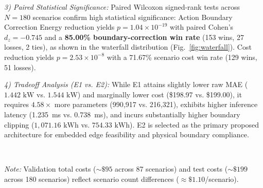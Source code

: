 \documentclass[journal]{IEEEtran}
\theoremstyle{remark}
\begin{document}
\textit{3) Paired Statistical Significance:} Paired Wilcoxon signed-rank tests across $N=180$ scenarios confirm high statistical significance: Action Boundary Correction Energy reduction yields \textbf{$p = 1.04 \times 10^{-19}$} with paired Cohen's \textbf{$d_z = -0.745$} and a \textbf{85.00\% boundary-correction win rate} (153 wins, 27 losses, 2 ties), as shown in the waterfall distribution (Fig.~\ref{fig:waterfall}). Cost reduction yields $p = 2.53 \times 10^{-8}$ with a 71.67\% scenario cost win rate (129 wins, 51 losses).

\textit{4) Tradeoff Analysis (E1 vs. E2):} While E1 attains slightly lower raw MAE ($1.442\text{ kW}$ vs. $1.544\text{ kW}$) and marginally lower cost (\$198.97 vs. \$199.00), it requires $4.58\times$ more parameters (990,917 vs. 216,321), exhibits higher inference latency (1.235~ms vs. 0.738~ms), and incurs substantially higher boundary clipping ($1,071.16\text{ kWh}$ vs. $754.33\text{ kWh}$). E2 is selected as the primary proposed architecture for embedded edge feasibility and physical boundary compliance.

\begin{table}[!t]
\centering
\caption{Loss Sensitivity Study Across Validation Scenarios}
\label{tab:sensitivity}
\vspace{1mm}\\
\raggedright\scriptsize{\textit{Note:} Validation total costs ($\sim \$95$ across 87 scenarios) and test costs ($\sim \$199$ across 180 scenarios) reflect scenario count differences ($\approx \$1.10$/scenario).}
\end{table}
\end{document}
